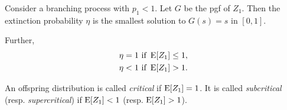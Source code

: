\begin{theorem*}
    Consider a branching process with $p_1 < 1$.
    Let $G$ be the pgf of $Z_1$.
    Then the extinction probability $\eta$ is the smallest solution to
    $G(s) = s$ in $[0, 1]$.

    Further, \begin{align*}
        \eta &= 1 \text{ if } \operatorname{\mathrm{E}}[Z_1] \leq 1, \\
        \eta &< 1 \text{ if } \operatorname{\mathrm{E}}[Z_1] > 1.
    \end{align*}
\end{theorem*}

\begin{definition}[Criticality] \label{def:criticality}
    An offspring distribution is called \emph{critical} if $\operatorname{\mathrm{E}}[Z_1] = 1$.
    It is called \emph{subcritical} (resp. \emph{supercritical}) if
    $\operatorname{\mathrm{E}}[Z_1] < 1$ (resp. $\operatorname{\mathrm{E}}[Z_1] > 1$).
\end{definition}
